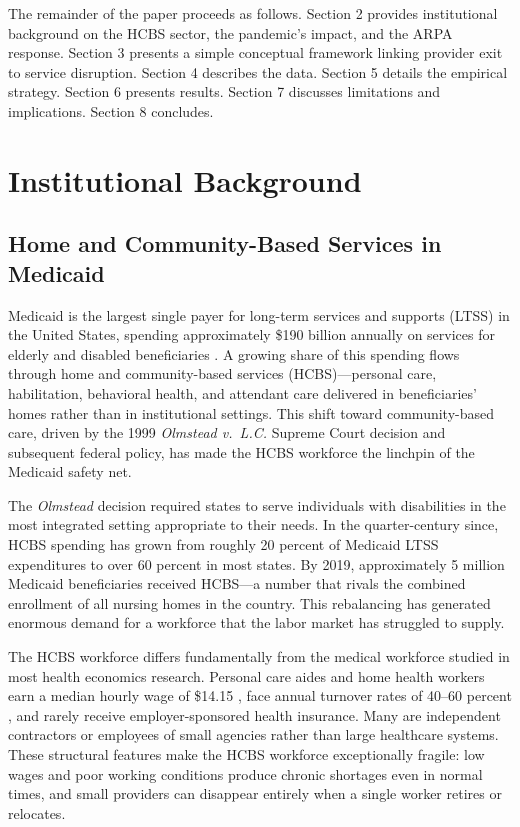\documentclass[12pt]{article}
\begin{document}
The remainder of the paper proceeds as follows. Section 2 provides institutional background on the HCBS sector, the pandemic's impact, and the ARPA response. Section 3 presents a simple conceptual framework linking provider exit to service disruption. Section 4 describes the data. Section 5 details the empirical strategy. Section 6 presents results. Section 7 discusses limitations and implications. Section 8 concludes.


\section{Institutional Background}

\subsection{Home and Community-Based Services in Medicaid}

Medicaid is the largest single payer for long-term services and supports (LTSS) in the United States, spending approximately \$190 billion annually on services for elderly and disabled beneficiaries \citep{cms2024medicaid}. A growing share of this spending flows through home and community-based services (HCBS)---personal care, habilitation, behavioral health, and attendant care delivered in beneficiaries' homes rather than in institutional settings. This shift toward community-based care, driven by the 1999 \emph{Olmstead v.\ L.C.} Supreme Court decision and subsequent federal policy, has made the HCBS workforce the linchpin of the Medicaid safety net.

The \emph{Olmstead} decision required states to serve individuals with disabilities in the most integrated setting appropriate to their needs. In the quarter-century since, HCBS spending has grown from roughly 20 percent of Medicaid LTSS expenditures to over 60 percent in most states. By 2019, approximately 5 million Medicaid beneficiaries received HCBS---a number that rivals the combined enrollment of all nursing homes in the country. This rebalancing has generated enormous demand for a workforce that the labor market has struggled to supply.

The HCBS workforce differs fundamentally from the medical workforce studied in most health economics research. Personal care aides and home health workers earn a median hourly wage of \$14.15 \citep{bls2023hcbs}, face annual turnover rates of 40--60 percent \citep{phi2023turnover}, and rarely receive employer-sponsored health insurance. Many are independent contractors or employees of small agencies rather than large healthcare systems. These structural features make the HCBS workforce exceptionally fragile: low wages and poor working conditions produce chronic shortages even in normal times, and small providers can disappear entirely when a single worker retires or relocates.
\end{document}
